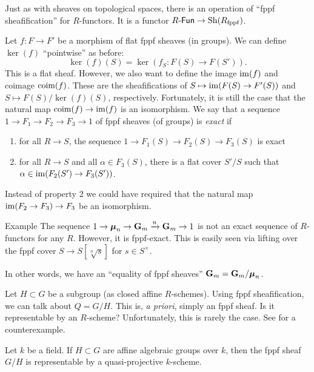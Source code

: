 Just as with sheaves on topological spaces, there is an operation of 
``fppf sheafification'' for $R$-functors. It is a functor 
$R\textnormal{-}\mathsf{Fun}\to \operatorname{Sh}(R_{\mathrm{fppf}})$. 

Let $f:F\to F'$ be a morphism of flat fppf sheaves (in groups). We can define 
$\ker(f)$ ``pointwise'' as before: 
\[
  \ker(f)(S) = \ker(f_S:F(S) \to F(S')) .
\]
This is a flat sheaf. However, we also want to define the image 
$\operatorname{im}(f)$ and coimage $\operatorname{coim}(f)$. These are the sheafifications of 
$S\mapsto \operatorname{im}(F(S)\to F'(S))$ and $S\mapsto F(S)/\ker(f)(S)$, 
respectively. Fortunately, it is still the case that the natural map 
$\operatorname{coim}(f) \to \operatorname{im}(f)$ is an isomorphism. We say that a sequence 
$1 \to F_1 \to F_2 \to F_3 \to 1$ of fppf sheaves (of groups) is \emph{exact} 
if 
\begin{enumerate}
  \item for all $R\to S$, the sequence $1\to F_1(S) \to F_2(S)\to F_3(S)$ is exact 
  \item for all $R\to S$ and all $\alpha\in F_3(S)$, there is a flat cover 
    $S'/S$ such that $\alpha\in \operatorname{im}(F_2(S') \to F_3(S'))$. 
\end{enumerate}

Instead of property 2 we could have required that the natural map 
$\operatorname{im}(F_2\to F_3) \to F_3$ be an isomorphism. 

\begin{enonce}[remark]{Example}
The sequence $1 \to \boldsymbol\mu_n \to \mathbf{G}_m \xrightarrow n \mathbf{G}_m \to 1$ is 
not an exact sequence of $R$-functors for any $R$. However, it is fppf-exact. 
This is easily seen via lifting over the fppf cover 
$S\to S[\sqrt[n] s]$ for $s\in S^\times$. 
\end{enonce}

In other words, we have an ``equality of fppf sheaves'' 
$\mathbf{G}_m = \mathbf{G}_m/\boldsymbol\mu_n$. 

Let $H\subset G$ be a subgroup (as closed affine $R$-schemes). Using fppf 
sheafification, we can talk about $Q=G/H$. This is, \emph{a priori}, simply 
an fppf sheaf. Is it representable by an $R$-scheme? Unfortunately, this is 
rarely the case. See \cite{r70} for a counterexample. 

\begin{theo}
Let $k$ be a field. If $H\subset G$ are affine algebraic groups over $k$, then 
the fppf sheaf $G/H$ is representable by a quasi-projective $k$-scheme. 
\end{theo}

